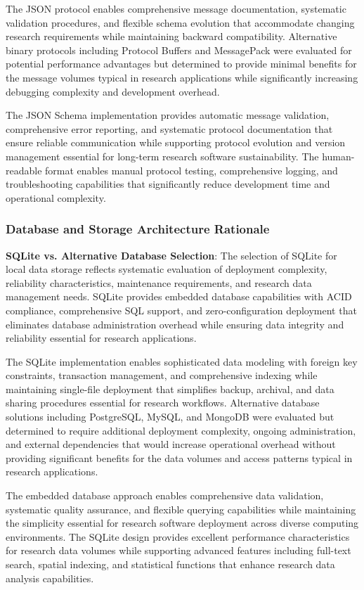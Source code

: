 \documentclass[12pt,a4paper]{article}
\begin{document}
The JSON protocol enables comprehensive message documentation, systematic validation procedures, and flexible schema
evolution that accommodate changing research requirements while maintaining backward compatibility. Alternative binary
protocols including Protocol Buffers and MessagePack were evaluated for potential performance advantages but determined
to provide minimal benefits for the message volumes typical in research applications while significantly increasing
debugging complexity and development overhead.

The JSON Schema implementation provides automatic message validation, comprehensive error reporting, and systematic
protocol documentation that ensure reliable communication while supporting protocol evolution and version management
essential for long-term research software sustainability. The human-readable format enables manual protocol testing,
comprehensive logging, and troubleshooting capabilities that significantly reduce development time and operational
complexity.

\subsubsection{Database and Storage Architecture Rationale}

\textbf{SQLite vs. Alternative Database Selection}: The selection of SQLite for local data storage reflects systematic
evaluation of deployment complexity, reliability characteristics, maintenance requirements, and research data management
needs. SQLite provides embedded database capabilities with ACID compliance, comprehensive SQL support, and
zero-configuration deployment that eliminates database administration overhead while ensuring data integrity and
reliability essential for research applications.

The SQLite implementation enables sophisticated data modeling with foreign key constraints, transaction management, and
comprehensive indexing while maintaining single-file deployment that simplifies backup, archival, and data sharing
procedures essential for research workflows. Alternative database solutions including PostgreSQL, MySQL, and MongoDB
were evaluated but determined to require additional deployment complexity, ongoing administration, and external
dependencies that would increase operational overhead without providing significant benefits for the data volumes and
access patterns typical in research applications.

The embedded database approach enables comprehensive data validation, systematic quality assurance, and flexible
querying capabilities while maintaining the simplicity essential for research software deployment across diverse
computing environments. The SQLite design provides excellent performance characteristics for research data volumes while
supporting advanced features including full-text search, spatial indexing, and statistical functions that enhance
research data analysis capabilities.
\end{document}
